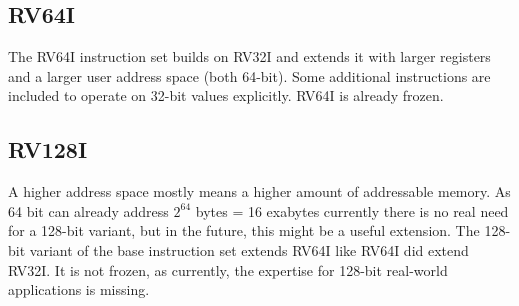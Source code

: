 \subsection{RV64I}
The RV64I instruction set builds on RV32I and extends it with
larger registers and a larger user address space (both 64-bit).
Some additional instructions are included to operate on 32-bit
values explicitly. RV64I is already frozen.

\subsection{RV128I}
A higher address space mostly means
a higher amount of addressable memory. As 64 bit can already
address $2^{64}$ bytes = 16 exabytes currently there is no
real need for a 128-bit variant, but in the future, this might
be a useful extension.
The 128-bit variant of the base instruction set extends RV64I like
RV64I did extend RV32I. It is not frozen, as currently,
the expertise for 128-bit real-world applications is missing.

